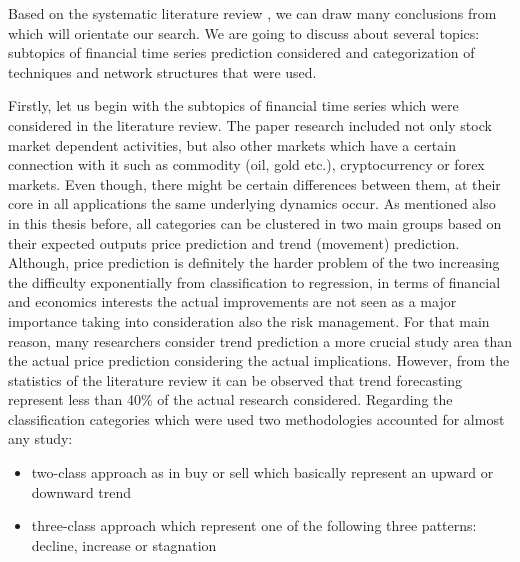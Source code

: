 \vspace{5mm}

Based on the systematic literature review \cite{sezer2020financial}, we can draw many conclusions from which will orientate our search. We are going to discuss about several topics: subtopics of financial time series prediction considered and categorization of techniques and network structures that were used.

Firstly, let us begin with the subtopics of financial time series which were considered in the literature review. The paper research included not only stock market dependent activities, but also other markets which have a certain connection with it such as commodity (oil, gold etc.), cryptocurrency or forex markets. Even though, there might be certain differences between them, at their core in all applications the same underlying dynamics occur. As mentioned also in this thesis before, all categories can be clustered in two main groups based on their expected outputs price prediction and trend (movement) prediction. Although, price prediction is definitely the harder problem of the two increasing the difficulty exponentially from classification to regression, in terms of financial and economics interests the actual improvements are not seen as a major importance taking into consideration also the risk management. For that main reason, many researchers consider trend prediction a more crucial study area than the actual price prediction considering the actual implications. However, from the statistics of the literature review \cite{sezer2020financial} it can be observed that trend forecasting represent less than 40\% of the actual research considered. Regarding the classification categories which were used two methodologies accounted for almost any study:
\begin{itemize}
    \item two-class approach as in buy or sell which basically represent an upward or downward trend
    \item three-class approach which represent one of the following three patterns: decline, increase or stagnation
\end{itemize}

